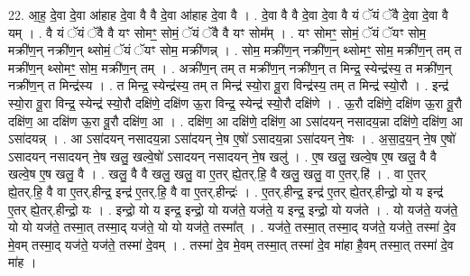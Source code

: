 \documentclass[17pt]{extarticle}
\begin{document}
22. आ॒ह॒ दे॒वा दे॒वा आ॑हाह दे॒वा वै वै दे॒वा आ॑हाह दे॒वा वै । . दे॒वा वै वै दे॒वा दे॒वा वै यं ॅयं ॅवै दे॒वा दे॒वा वै यम् । . वै यं ॅयं ॅवै वै यꣳ सोमꣳ॒॒ सोमं॒ ॅयं ॅवै वै यꣳ सोम᳚म् । . यꣳ सोमꣳ॒॒ सोमं॒ ॅयं ॅयꣳ सोम॒ मक्री॑ण॒न् नक्री॑ण॒न् थ्सोमं॒ ॅयं ॅयꣳ सोम॒ मक्री॑णन्न् । . सोम॒ मक्री॑ण॒न् नक्री॑ण॒न् थ्सोमꣳ॒॒ सोम॒ मक्री॑ण॒न् तम् त मक्री॑ण॒न् थ्सोमꣳ॒॒ सोम॒ मक्री॑ण॒न् तम् । . अक्री॑ण॒न् तम् त मक्री॑ण॒न् नक्री॑ण॒न् त मिन्द्र॒ स्येन्द्र॑स्य॒ त मक्री॑ण॒न् नक्री॑ण॒न् त मिन्द्र॑स्य । . त मिन्द्र॒ स्येन्द्र॑स्य॒ तम् त मिन्द्र॑ स्यो॒रा वू॒रा विन्द्र॑स्य॒ तम् त मिन्द्र॑ स्यो॒रौ । . इन्द्र॑ स्यो॒रा वू॒रा विन्द्र॒ स्येन्द्र॑ स्यो॒रौ दक्षि॑णे॒ दक्षि॑ण ऊ॒रा विन्द्र॒ स्येन्द्र॑ स्यो॒रौ दक्षि॑णे । . ऊ॒रौ दक्षि॑णे॒ दक्षि॑ण ऊ॒रा वू॒रौ दक्षि॑ण॒ आ दक्षि॑ण ऊ॒रा वू॒रौ दक्षि॑ण॒ आ । . दक्षि॑ण॒ आ दक्षि॑णे॒ दक्षि॑ण॒ आ ऽसा॑दयन् नसादय॒न्ना दक्षि॑णे॒ दक्षि॑ण॒ आ ऽसा॑दयन्न् । . आ ऽसा॑दयन् नसादय॒न्ना ऽसा॑दयन् ने॒ष ए॒षो॑ ऽसादय॒न्ना ऽसा॑दयन् ने॒षः । . अ॒सा॒द॒य॒न् ने॒ष ए॒षो॑ ऽसादयन् नसादयन् ने॒ष खलु॒ खल्वे॒षो॑ ऽसादयन् नसादयन् ने॒ष खलु॑ । . ए॒ष खलु॒ खल्वे॒ष ए॒ष खलु॒ वै वै खल्वे॒ष ए॒ष खलु॒ वै । . खलु॒ वै वै खलु॒ खलु॒ वा ए॒तर् ह्ये॒तर्.हि॒ वै खलु॒ खलु॒ वा ए॒तर्.हि॑ । . वा ए॒तर् ह्ये॒तर्.हि॒ वै वा ए॒तर्.हीन्द्र॒ इन्द्र॑ ए॒तर्.हि॒ वै वा ए॒तर्.हीन्द्रः॑ । . ए॒तर्.हीन्द्र॒ इन्द्र॑ ए॒तर् ह्ये॒तर्.हीन्द्रो॒ यो य इन्द्र॑ ए॒तर् ह्ये॒तर्.हीन्द्रो॒ यः । . इन्द्रो॒ यो य इन्द्र॒ इन्द्रो॒ यो यज॑ते॒ यज॑ते॒ य इन्द्र॒ इन्द्रो॒ यो यज॑ते । . यो यज॑ते॒ यज॑ते॒ यो यो यज॑ते॒ तस्मा॒त् तस्मा॒द् यज॑ते॒ यो यो यज॑ते॒ तस्मा᳚त् । . यज॑ते॒ तस्मा॒त् तस्मा॒द् यज॑ते॒ यज॑ते॒ तस्मा॑ दे॒व मे॒वम् तस्मा॒द् यज॑ते॒ यज॑ते॒ तस्मा॑ दे॒वम् । . तस्मा॑ दे॒व मे॒वम् तस्मा॒त् तस्मा॑ दे॒व मा॑हा है॒वम् तस्मा॒त् तस्मा॑ दे॒व मा॑ह । \newline
\end{document}
